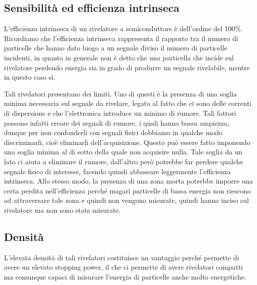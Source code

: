 \vspace{-0.15cm}

\subsection{Sensibilità ed efficienza intrinseca}

L'efficienza intrinseca di un rivelatore a semiconduttore è dell'ordine del 100\%. Ricordiamo che l'efficienza intrinseca rappresenta il rapporto tra il numero di particelle che hanno dato luogo a un segnale diviso il numero di particelle incidenti, in quanto in generale non è detto che una particella che incide sul rivelatore perdendo energia sia in grado di produrre un segnale rivelabile, mentre in questo caso sì.

Tali rivelatori presentano dei limiti. Uno di questi è la presenza di una soglia minima necessaria sul segnale da rivelare, legata al fatto che ci sono delle correnti di dispersione e che l'elettronica introduce un minimo di rumore. Tali fattori possono infatti creare dei segnali di rumore, i quali hanno bassa ampiezza, dunque per non confonderli con segnali fisici dobbiamo in qualche modo discriminarli, cioè eliminarli dell'acquisizione. Questo può essere fatto imponendo una soglia minima al di sotto della quale non acquisire nulla. Tale soglia da un lato ci aiuta a eliminare il rumore, dall'altro però potrebbe far perdere qualche segnale fisico di interesse, facendo quindi abbassare leggermente l'efficienza intrinseca. Allo stesso modo, la presenza di una zona morta potrebbe imporre una certa perdita nell'efficienza perché magari particelle di bassa energia non riescono ad attraversare tale zona e quindi non vengono misurate, quindi hanno inciso sul rivelatore ma non sono state misurate.

\vspace{-0.15cm}

\subsection{Densità}
L'elevata densità di tali rivelatori costituisce un vantaggio perché permette di avere un elevato stopping power, il che ci permette di avere rivelatori compatti ma comunque capaci di misurare l'energia di particelle anche molto energetiche.

